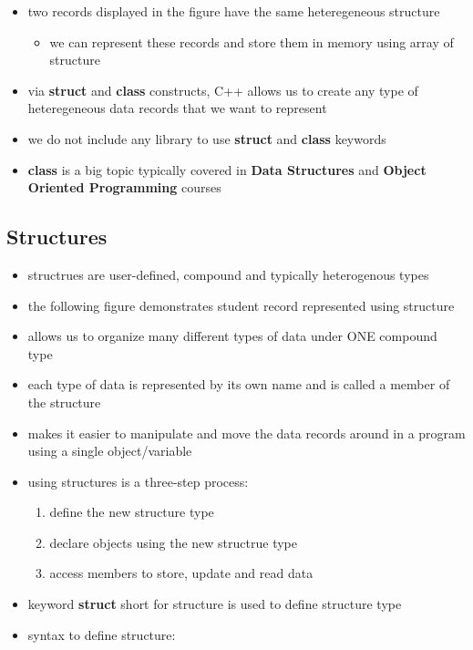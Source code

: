 \documentclass[11pt]{article}
\providecommand{\tightlist}{%
      \setlength{\itemsep}{0pt}\setlength{\parskip}{0pt}}
\begin{document}
\begin{itemize}
\tightlist
\item
  two records displayed in the figure have the same heteregeneous
  structure

  \begin{itemize}
  \tightlist
  \item
    we can represent these records and store them in memory using array
    of structure
  \end{itemize}
\item
  via \textbf{struct} and \textbf{class} constructs, C++ allows us to
  create any type of heteregeneous data records that we want to
  represent
\item
  we do not include any library to use \textbf{struct} and
  \textbf{class} keywords
\item
  \textbf{class} is a big topic typically covered in \textbf{Data
  Structures} and \textbf{Object Oriented Programming} courses
\end{itemize}

\hypertarget{structures}{%
\subsection{Structures}\label{structures}}

\begin{itemize}
\tightlist
\item
  structrues are user-defined, compound and typically heterogenous types
\item
  the following figure demonstrates student record represented using
  structure
\item
  allows us to organize many different types of data under ONE compound
  type
\item
  each type of data is represented by its own name and is called a
  member of the structure
\item
  makes it easier to manipulate and move the data records around in a
  program using a single object/variable
\item
  using structures is a three-step process:

  \begin{enumerate}
  \def\labelenumi{\arabic{enumi}.}
  \tightlist
  \item
    define the new structure type
  \item
    declare objects using the new structrue type
  \item
    access members to store, update and read data
  \end{enumerate}
\item
  keyword \textbf{struct} short for structure is used to define
  structure type\\
\item
  syntax to define structure:
\end{itemize}
\end{document}
